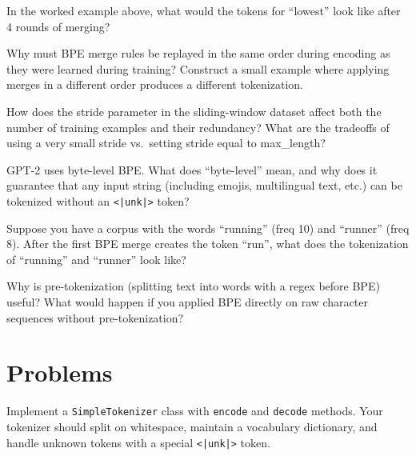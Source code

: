 \begin{reviewquestion}[7]
  In the worked example above, what would the tokens for ``lowest'' look
  like after 4 rounds of merging?
\end{reviewquestion}

\begin{reviewquestion}[8]
  Why must BPE merge rules be replayed in the same order during encoding
  as they were learned during training? Construct a small example where
  applying merges in a different order produces a different tokenization.
\end{reviewquestion}

\begin{reviewquestion}[9]
  How does the stride parameter in the sliding-window dataset affect both
  the number of training examples and their redundancy? What are the
  tradeoffs of using a very small stride vs.\ setting stride equal to
  max\_length?
\end{reviewquestion}

\begin{reviewquestion}[10]
  GPT-2 uses byte-level BPE. What does ``byte-level'' mean, and why does
  it guarantee that any input string (including emojis, multilingual text,
  etc.) can be tokenized without an \texttt{<|unk|>} token?
\end{reviewquestion}

\begin{reviewquestion}[11]
  Suppose you have a corpus with the words ``running'' (freq 10) and
  ``runner'' (freq 8). After the first BPE merge creates the token ``run'',
  what does the tokenization of ``running'' and ``runner'' look like?
\end{reviewquestion}

\begin{reviewquestion}[12]
  Why is pre-tokenization (splitting text into words with a regex before
  BPE) useful? What would happen if you applied BPE directly on raw
  character sequences without pre-tokenization?
\end{reviewquestion}

\section*{Problems}

\begin{problem}[1]
  Implement a \texttt{SimpleTokenizer} class with \texttt{encode} and
  \texttt{decode} methods. Your tokenizer should split on whitespace,
  maintain a vocabulary dictionary, and handle unknown tokens with a
  special \texttt{<|unk|>} token.
\end{problem}

